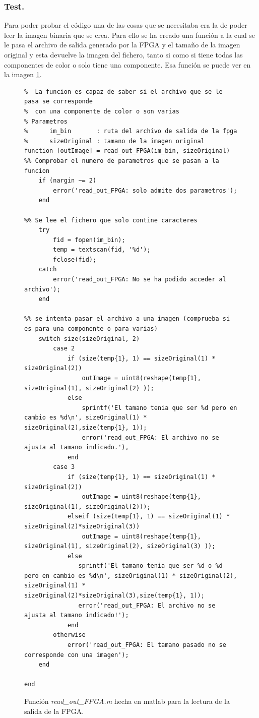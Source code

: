 \documentclass{article}
\begin{document}
	
\subsubsection{Test.}

	Para poder probar el código una de las cosas que se necesitaba era la de poder leer la imagen binaria que se crea. Para ello se ha creado una función a la cual se le pasa el archivo de salida generado por la FPGA y el tamaño de la imagen original y esta devuelve la imagen del fichero, tanto si como si tiene todas las componentes de color o solo tiene una componente. Esa función se puede ver en la imagen \ref{cod:p7a:read_out_FPGA}.
	
\begin{figure}[h]
	\begin{lstlisting}[style=matlab]	
%% La funcion lee la salida que se ha producido en la fpga.
%  La funcion es capaz de saber si el archivo que se le pasa se corresponde
%  con una componente de color o son varias
% Parametros
%      im_bin       : ruta del archivo de salida de la fpga
%      sizeOriginal : tamano de la imagen original
function [outImage] = read_out_FPGA(im_bin, sizeOriginal)
%% Comprobar el numero de parametros que se pasan a la funcion
    if (nargin ~= 2)
        error('read_out_FPGA: solo admite dos parametros');
    end

%% Se lee el fichero que solo contine caracteres
    try
        fid = fopen(im_bin);
        temp = textscan(fid, '%d');
        fclose(fid);
    catch
        error('read_out_FPGA: No se ha podido acceder al archivo');
    end
    
%% se intenta pasar el archivo a una imagen (comprueba si es para una componente o para varias)
    switch size(sizeOriginal, 2)
        case 2
            if (size(temp{1}, 1) == sizeOriginal(1) * sizeOriginal(2))
                outImage = uint8(reshape(temp{1}, sizeOriginal(1), sizeOriginal(2) ));
            else
                sprintf('El tamano tenia que ser %d pero en cambio es %d\n', sizeOriginal(1) * sizeOriginal(2),size(temp{1}, 1));
                error('read_out_FPGA: El archivo no se ajusta al tamano indicado.'),
            end
        case 3
            if (size(temp{1}, 1) == sizeOriginal(1) * sizeOriginal(2))
                outImage = uint8(reshape(temp{1}, sizeOriginal(1), sizeOriginal(2)));
            elseif (size(temp{1}, 1) == sizeOriginal(1) * sizeOriginal(2)*sizeOriginal(3))
                outImage = uint8(reshape(temp{1}, sizeOriginal(1), sizeOriginal(2), sizeOriginal(3) ));
            else
               sprintf('El tamano tenia que ser %d o %d pero en cambio es %d\n', sizeOriginal(1) * sizeOriginal(2), sizeOriginal(1) * sizeOriginal(2)*sizeOriginal(3),size(temp{1}, 1));
               error('read_out_FPGA: El archivo no se ajusta al tamano indicado!');
            end
        otherwise
            error('read_out_FPGA: El tamano pasado no se corresponde con una imagen');
    end

end
	\end{lstlisting}
	\caption{Función \emph{read\_out\_FPGA.m} hecha en matlab para la lectura de la salida de la FPGA.}
	\label{cod:p7a:read_out_FPGA}
\end{figure}	
\end{document}
